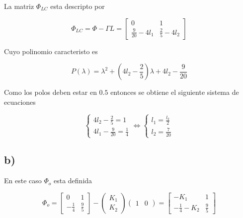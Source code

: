 \documentclass[11pt,a4paper]{article}
\newcommand{\siseq}[1]{ \left\{ \begin{array}{c}
    #1
\end{array} \right. }
\begin{document}
    La matriz $\Phi_{LC}$ esta descripto por 
    
    \begin{equation}
        \Phi_{LC} = \Phi - \Gamma L = 
        \begin{bmatrix}
            0 & 1 \\
            \frac{9}{20} - 4l_1 & \frac{2}{5} - 4l_2
        \end{bmatrix}
    \end{equation}

    Cuyo polinomio caracteristo es 

    \begin{equation}
        P(\lambda) = \lambda ^ 2 + \left( 4l_2 - \frac{2}{5} \right) \lambda + 4l_2 - \frac{9}{20}
    \end{equation}

    Como los polos deben estar en $0.5$ entonces se obtiene el siguiente sistema de ecuaciones 

    \begin{equation}
        \siseq{
            4l_2 - \frac{2}{5} = 1 \\
            4l_1 - \frac{9}{20} = \frac{1}{4}
        }
        \Leftrightarrow
        \siseq{
            l_1 = \frac{l_2}{2} \\ 
            l_2 = \frac{7}{20}
        }
    \end{equation}

    \subsection*{b)}

    En este caso $\Phi_o$ esta definida

    \begin{equation}
        \Phi_o = 
        \begin{bmatrix}
            0 & 1 \\
            -\frac{1}{4} & \frac{9}{5}
        \end{bmatrix}
        -
        \begin{pmatrix}
            K_1 \\ K_2
        \end{pmatrix}
        \begin{pmatrix}
            1 & 0
        \end{pmatrix} = 
        \begin{bmatrix}
            -K_1 & 1 \\
            -\frac{1}{4} - K_2 & \frac{9}{5}
        \end{bmatrix}
    \end{equation}
\end{document}
